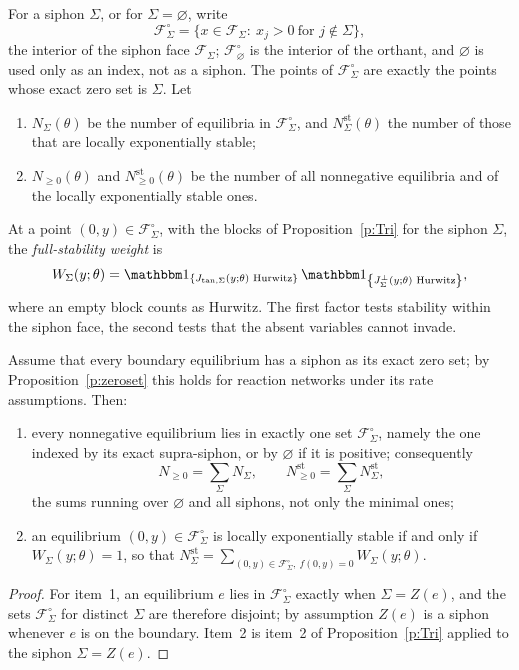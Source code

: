For a siphon $\Sigma$, or for $\Sigma=\varnothing$, write
\[
\mathcal F_\Sigma^\circ=\{x\in \mathcal F_\Sigma:\ x_j>0\ \text{for } j\notin \Sigma\},
\]
the interior of the siphon face $\mathcal F_\Sigma$; $\mathcal F_\varnothing^\circ$ is the interior
of the orthant, and $\varnothing$ is used only as an index, not as a siphon.
The points of $\mathcal F_\Sigma^\circ$ are exactly the points whose exact zero set is $\Sigma$.
Let
\begin{enumerate}
\item $N_\Sigma(\theta)$ be the number of equilibria in $\mathcal F_\Sigma^\circ$, and
$N_\Sigma^{\mathrm{st}}(\theta)$ the number of those that are locally exponentially
stable;
\item $N_{\ge0}(\theta)$ and $N_{\ge0}^{\mathrm{st}}(\theta)$ be the number of
all nonnegative equilibria and of the locally exponentially stable ones.
\end{enumerate}
At a point $(0,y)\in \mathcal F_\Sigma^\circ$, with the blocks of Proposition~\ref{p:Tri}
for the siphon $\Sigma$, the \emph{full-stability weight} is
\begin{equation}\label{eq:weight}
W_\Sigma(y;\theta)=
\ind{J_{\mathrm{tan},\Sigma}(y;\theta)\text{ Hurwitz}}\,
\ind{\JtrS{\Sigma}(y;\theta)\text{ Hurwitz}},
\end{equation}
where an empty block counts as Hurwitz. The first factor tests stability
within the siphon face, the second tests that the absent variables cannot
invade.
\eeD

Assume that every boundary equilibrium has a siphon as its exact zero set; by
Proposition~\ref{p:zeroset} this holds for reaction networks under its rate
assumptions. Then:
\begin{enumerate}
\item every nonnegative equilibrium lies in exactly one set $\mathcal F_\Sigma^\circ$, namely
the one indexed by its exact supra-siphon, or by $\varnothing$ if it is
positive; consequently
\[
N_{\ge0}=\sum_\Sigma N_\Sigma,\qquad N_{\ge0}^{\mathrm{st}}=\sum_\Sigma N_\Sigma^{\mathrm{st}},
\]
the sums running over $\varnothing$ and all siphons, not only the minimal
ones;
\item an equilibrium $(0,y)\in \mathcal F_\Sigma^\circ$ is locally exponentially stable if
and only if $W_\Sigma(y;\theta)=1$, so that
$N_\Sigma^{\mathrm{st}}=\sum_{(0,y)\in \mathcal F_\Sigma^\circ,\ f(0,y)=0}W_\Sigma(y;\theta)$.
\end{enumerate}
\eeP
\begin{proof}
For item~1, an equilibrium $e$ lies in $\mathcal F_\Sigma^\circ$ exactly when $\Sigma=Z(e)$, and
the sets $\mathcal F_\Sigma^\circ$ for distinct $\Sigma$ are therefore disjoint; by assumption
$Z(e)$ is a siphon whenever $e$ is on the boundary. Item~2 is item~2 of
Proposition~\ref{p:Tri} applied to the siphon $\Sigma=Z(e)$.
\end{proof}

